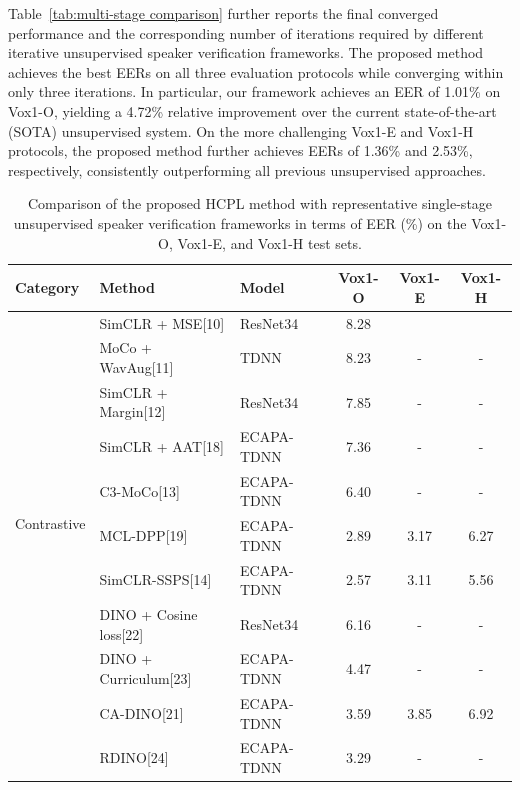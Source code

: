 \documentclass[lettersize,journal]{IEEEtran}
\begin{document}
Table~\ref{tab:multi-stage comparison} further reports the final converged performance and the corresponding number of iterations required by different iterative unsupervised speaker verification frameworks. The proposed method achieves the best EERs on all three evaluation protocols while converging within only three iterations. In particular, our framework achieves an EER of 1.01\% on Vox1-O, yielding a 4.72\% relative improvement over the current state-of-the-art (SOTA) unsupervised system. On the more challenging Vox1-E and Vox1-H protocols, the proposed method further achieves EERs of 1.36\% and 2.53\%, respectively, consistently outperforming all previous unsupervised approaches.

\begin{table}[t] %
    \centering
   \caption{Comparison of the proposed HCPL method with representative single-stage unsupervised speaker verification frameworks in terms of EER (\%) on the Vox1-O, Vox1-E, and Vox1-H test sets.} %
    \setlength{\tabcolsep}{10pt} %
    \begin{tabular}{l l l  c c c} %
        \hline
        Category & Method  & Model   & Vox1-O & Vox1-E & Vox1-H  \\
        \hline
        \multirow{10}{*}{Contrastive}
        &SimCLR + MSE[10] & ResNet34 & 8.28 &  &    \\
        &MoCo + WavAug[11]& TDNN & 8.23 &-  &-    \\
        &SimCLR + Margin[12]& ResNet34 & 7.85 & - &  -  \\
        &SimCLR + AAT[18]& ECAPA-TDNN & 7.36 & - & -   \\
        &C3-MoCo[13]& ECAPA-TDNN & 6.40 &-  & -   \\
        &MCL-DPP[19]& ECAPA-TDNN & 2.89 & 3.17 & 6.27   \\
        &SimCLR-SSPS[14]& ECAPA-TDNN & 2.57 &3.11  & 5.56   \\
        \hline
        \multirow{9}{*}{Self-distillation}
        &DINO + Cosine loss[22]&ResNet34&  6.16 & - & -   \\
        &DINO + Curriculum[23]&ECAPA-TDNN&  4.47 & - & -   \\
        &CA-DINO[21]&ECAPA-TDNN& 3.59 & 3.85 &  6.92  \\
        &RDINO[24]&ECAPA-TDNN& 3.29 & - & -   \\

\end{tabular}
\end{table}
\end{document}
